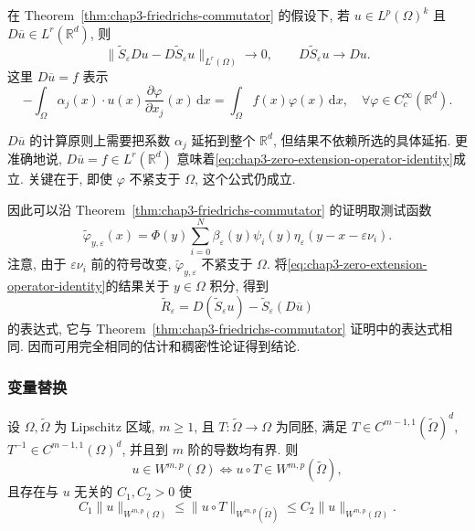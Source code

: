 \begin{Theorem}
\label{thm:chap3-adjoint-mollifier-commutator}
在 Theorem~\ref{thm:chap3-friedrichs-commutator} 的假设下, 若 $u\in L^p(\Omega)^k$ 且 $D\overline u\in L^r(\mathbb R^d)$, 则
\[
 \|\widetilde S_\varepsilon Du-D\widetilde S_\varepsilon u\|_{L^r(\Omega)}\to0,
 \qquad D\widetilde S_\varepsilon u\to Du.
\]
这里 $D\overline u=f$ 表示
\begin{equation}
 -\int_\Omega\alpha_j(x)\cdot u(x)\frac{\partial\varphi}{\partial x_j}(x)\,\mathrm dx
 =\int_\Omega f(x)\varphi(x)\,\mathrm dx,
 \quad\forall\varphi\in C_c^\infty(\mathbb R^d).
 \label{eq:chap3-zero-extension-operator-identity}
\end{equation}
\end{Theorem}

\begin{Proof}
$D\overline u$ 的计算原则上需要把系数 $\alpha_j$ 延拓到整个 $\mathbb R^d$, 但结果不依赖所选的具体延拓. 更准确地说, $D\overline u=f\in L^r(\mathbb R^d)$ 意味着\eqref{eq:chap3-zero-extension-operator-identity}成立. 关键在于, 即使 $\varphi$ 不紧支于 $\Omega$, 这个公式仍成立.

因此可以沿 Theorem~\ref{thm:chap3-friedrichs-commutator} 的证明取测试函数
\[
 \widetilde\varphi_{y,\varepsilon}(x)
 =\Phi(y)\sum_{i=0}^N\beta_\varepsilon(y)\psi_i(y)
 \eta_\varepsilon(y-x-\varepsilon\nu_i).
\]
注意, 由于 $\varepsilon\nu_i$ 前的符号改变, $\widetilde\varphi_{y,\varepsilon}$ 不紧支于 $\Omega$. 将\eqref{eq:chap3-zero-extension-operator-identity}的结果关于 $y\in\Omega$ 积分, 得到
\[
 \widetilde R_\varepsilon
 =D(\widetilde S_\varepsilon u)-\widetilde S_\varepsilon(D\overline u)
\]
的表达式, 它与 Theorem~\ref{thm:chap3-friedrichs-commutator} 证明中的表达式相同. 因而可用完全相同的估计和稠密性论证得到结论.
\end{Proof}

\subsubsection{变量替换}
\label{subsec:chap3-change-of-variables}

\begin{Theorem}
\label{thm:chap3-sobolev-change-of-variables}
设 $\Omega,\widetilde\Omega$ 为 Lipschitz 区域, $m\geq1$, 且 $T:\widetilde\Omega\to\Omega$ 为同胚, 满足 $T\in C^{m-1,1}(\widetilde\Omega)^d$, $T^{-1}\in C^{m-1,1}(\Omega)^d$, 并且到 $m$ 阶的导数均有界. 则
\[
 u\in W^{m,p}(\Omega)\Longleftrightarrow u\circ T\in W^{m,p}(\widetilde\Omega),
\]
且存在与 $u$ 无关的 $C_1,C_2>0$ 使
\[
 C_1\|u\|_{W^{m,p}(\Omega)}\leq\|u\circ T\|_{W^{m,p}(\widetilde\Omega)}
 \leq C_2\|u\|_{W^{m,p}(\Omega)}.
\]
\end{Theorem}

